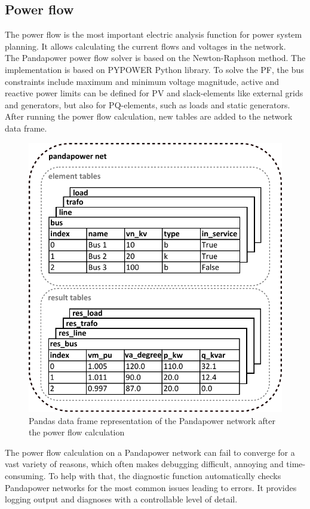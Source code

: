 \subsection{Power flow}
The power flow is the most important electric analysis function for power system planning. It allows calculating the current flows and voltages in the network. \\
The Pandapower power flow solver is based on the Newton-Raphson method. The implementation is based on PYPOWER Python library. To solve the \gls{PF}, the bus constraints include maximum and minimum voltage magnitude, active and reactive power limits can be defined for PV and slack-elements like external grids and generators, but also for PQ-elements, such as loads and static generators. \\


After running the power flow calculation, new tables are added to the network data frame.
\begin{figure}[H]
\centering
    \includegraphics[width=.6\linewidth]{images/Background/Pandapower/Pandapower_resnet_big.pdf}
\caption{Pandas data frame representation of the Pandapower network after the power flow calculation}
\end{figure}

The power flow calculation on a Pandapower network can fail to converge for a vast variety of reasons, which often makes debugging difficult, annoying and time-consuming. To help with that, the diagnostic function automatically checks Pandapower networks for the most common issues leading to errors. It provides logging output and diagnoses with a controllable level of detail.

